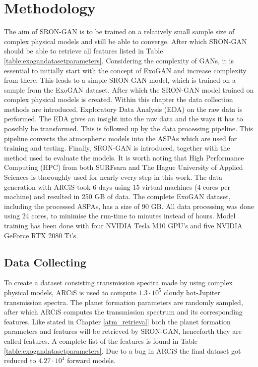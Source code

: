 \chapter{Methodology}
The aim of SRON-GAN is to be trained on a relatively small sample size of complex physical models and still be able to converge. After which SRON-GAN should be able to retrieve all features listed in Table \ref{table:exogandatasetparameters}. Considering the complexity of GANs, it is essential to initially start with the concept of ExoGAN and increase complexity from there. This leads to a simple SRON-GAN model, which is trained on a sample from the ExoGAN dataset. After which the SRON-GAN model trained on complex physical models is created. Within this chapter the data collection methods are introduced. Exploratory Data Analysis (EDA) on the raw data is performed. The EDA gives an insight into the raw data and the ways it has to possibly be transformed. This is followed up by the data processing pipeline. This pipeline converts the atmospheric models into the ASPAs which are used for training and testing. Finally, SRON-GAN is introduced, together with the method used to evaluate the models. It is worth noting that High Performance Computing (HPC) from both SURFsara and The Hague University of Applied Sciences is thoroughly used for nearly every step in this work. The data generation with ARCiS took 6 days using 15 virtual machines (4 cores per machine) and resulted in 250 GB of data. The complete ExoGAN dataset, including the processed ASPAs, has a size of 90 GB. All data processing was done using 24 cores, to minimise the run-time to minutes instead of hours. Model training has been done with four NVIDIA Tesla M10 GPU's and five NVIDIA GeForce RTX 2080 Ti's.



\section{Data Collecting}
To create a dataset consisting transmission spectra made by using complex physical models, ARCiS is used to compute $1.3\cdot 10^5$ cloudy hot-Jupiter transmission spectra. The planet formation parameters are randomly sampled, after which ARCiS computes the transmission spectrum and its corresponding features. Like stated in Chapter \ref{atm_retrieval} both the planet formation parameters and features will be retrieved by SRON-GAN, henceforth they are called features. A complete list of the features is found in Table \ref{table:exogandatasetparameters}. Due to a bug in ARCiS the final dataset got reduced to $4.27\cdot10^4$ forward models. 

